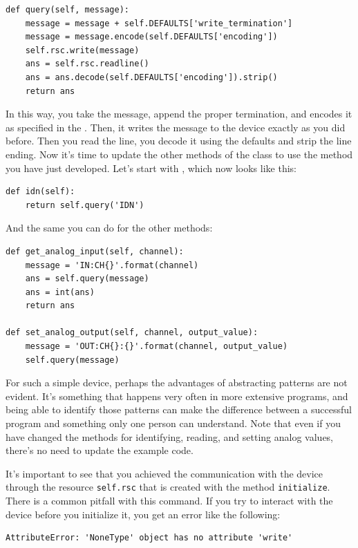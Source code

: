\begin{verbatim}
def query(self, message):
    message = message + self.DEFAULTS['write_termination']
    message = message.encode(self.DEFAULTS['encoding'])
    self.rsc.write(message)
    ans = self.rsc.readline()
    ans = ans.decode(self.DEFAULTS['encoding']).strip()
    return ans
\end{verbatim}

In this way, you take the message, append the proper termination, and encodes it as specified in the . Then, it writes the message to the
device exactly as you did before. Then you read the line, you decode it using the defaults and strip the line ending. Now it's time to update the other methods of the class to use the  method you have just developed. Let's start with , which now looks like this:

\begin{verbatim}
def idn(self):
    return self.query('IDN')
\end{verbatim}

And the same you can do for the other methods:

\begin{verbatim}
def get_analog_input(self, channel):
    message = 'IN:CH{}'.format(channel)
    ans = self.query(message)
    ans = int(ans)
    return ans

def set_analog_output(self, channel, output_value):
    message = 'OUT:CH{}:{}'.format(channel, output_value)
    self.query(message)
\end{verbatim}

For such a simple device, perhaps the advantages of abstracting patterns are not evident. It's something that happens very often in more extensive programs, and being able to identify those patterns can make the difference between a successful program and something only one person can understand. Note that even if you have changed the methods for identifying, reading, and setting analog values, there's no need to update the example code.

It's important to see that you achieved the communication with the device through the resource \texttt{self.rsc} that is created with the method \texttt{initialize}. There is a common pitfall with this command. If you try to interact with the device before you initialize it, you get an error like the following:

\begin{verbatim}
AttributeError: 'NoneType' object has no attribute 'write'
\end{verbatim}

